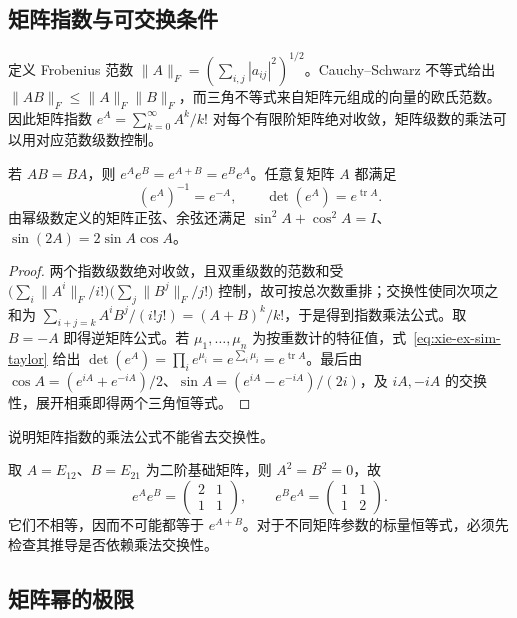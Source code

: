 \subsection{矩阵指数与可交换条件}

定义 Frobenius 范数 $\|A\|_F=(\sum_{i,j}|a_{ij}|^2)^{1/2}$。Cauchy--Schwarz 不等式给出 $\|AB\|_F\leq\|A\|_F\|B\|_F$，而三角不等式来自矩阵元组成的向量的欧氏范数。因此矩阵指数 $e^A=\sum_{k=0}^{\infty}A^k/k!$ 对每个有限阶矩阵绝对收敛，矩阵级数的乘法可以用对应范数级数控制。

\begin{proposition}
\label{prop:xie-ex-sim-exp}
若 $AB=BA$，则 $e^Ae^B=e^{A+B}=e^Be^A$。任意复矩阵 $A$ 都满足
\[
 (e^A)^{-1}=e^{-A},\qquad
 \det(e^A)=e^{\operatorname{tr}A}.
\]
由幂级数定义的矩阵正弦、余弦还满足 $\sin^2A+\cos^2A=I$、$\sin(2A)=2\sin A\cos A$。
\end{proposition}
\begin{proof}
两个指数级数绝对收敛，且双重级数的范数和受 $\bigl(\sum_i\|A^i\|_F/i!\bigr)\bigl(\sum_j\|B^j\|_F/j!\bigr)$ 控制，故可按总次数重排；交换性使同次项之和为 $\sum_{i+j=k}A^iB^j/(i!j!)=(A+B)^k/k!$，于是得到指数乘法公式。取 $B=-A$ 即得逆矩阵公式。若 $\mu_1,\ldots,\mu_n$ 为按重数计的特征值，式~\eqref{eq:xie-ex-sim-taylor} 给出 $\det(e^A)=\prod_i e^{\mu_i}=e^{\sum_i\mu_i}=e^{\operatorname{tr}A}$。最后由 $\cos A=(e^{iA}+e^{-iA})/2$、$\sin A=(e^{iA}-e^{-iA})/(2i)$，及 $iA,-iA$ 的交换性，展开相乘即得两个三角恒等式。
\end{proof}

\begin{example}
说明矩阵指数的乘法公式不能省去交换性。
\end{example}
\begin{solve}
取 $A=E_{12}$、$B=E_{21}$ 为二阶基础矩阵，则 $A^2=B^2=0$，故
\[
 e^Ae^B=\begin{pmatrix}2&1\\1&1\end{pmatrix},
 \qquad e^Be^A=\begin{pmatrix}1&1\\1&2\end{pmatrix}.
\]
它们不相等，因而不可能都等于 $e^{A+B}$。对于不同矩阵参数的标量恒等式，必须先检查其推导是否依赖乘法交换性。
\end{solve}

\subsection{矩阵幂的极限}

